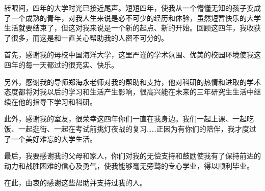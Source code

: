 
\begin{ack}
转眼间，四年的大学时光已接近尾声。短短四年，使我从一个懵懂无知的孩子变成了一个成熟的青年，对我人生来说是必不可少的经历和体验，虽然短暂快乐的大学生活就要结束了，但这对我来说是一个新的起点、新的开始。回顾这四年，我收获了很多，而这是和一直关心帮助我的人密不可分的。

   首先，感谢我的母校中国海洋大学，这里严谨的学术氛围、优美的校园环境使我这四年的每一天都过的很充实、快乐。

   另外，感谢我的导师郑海永老师对我的帮助和支持，他对科研的热情和进取的学术态度都将对我以后的学习和生活产生影响，很高兴能在未来的三年研究生生活中继续在他的指导下学习和科研。

   此外，感谢我的室友，很荣幸这四年你们一直在我身边。我们一起上课、一起吃饭、一起逛街、一起在考试前挑灯夜战的复习……正因为有你们的陪伴，我才度过了一个美好难忘的大学生活。

   最后，我要感谢我的父母和家人，你们对我的无偿支持和鼓励使我有了保持前进的动力和战胜困难的信心及勇气，使我能够毫无旁骛的专心学业，得以顺利毕业。

   在此，由衷的感谢这些帮助并支持过我的人。


\end{ack}
